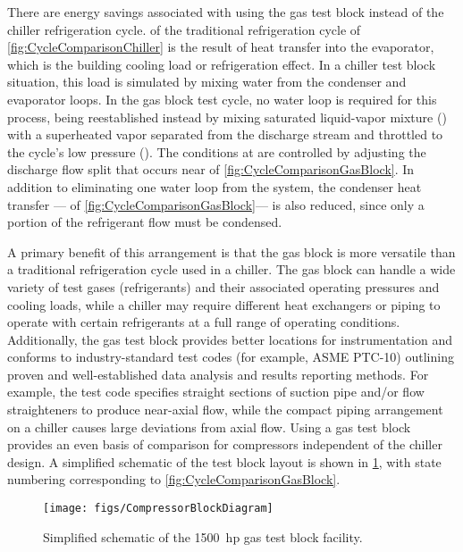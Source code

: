 There are energy savings associated with using the gas test block 
instead of the chiller refrigeration cycle. 
 of the traditional refrigeration cycle of \cref{fig:CycleComparisonChiller} 
is the result of heat transfer into the evaporator, 
which is the building cooling load or refrigeration effect. 
In a chiller test block situation, this load is simulated 
by mixing water from the condenser and evaporator loops. 
In the gas block test cycle, no water loop is required for this process, 
 being reestablished instead by mixing saturated liquid-vapor mixture () 
with a superheated vapor separated from the discharge stream and throttled to the cycle's low pressure (). 
The conditions at  are controlled by adjusting 
the discharge flow split that occurs near  of \cref{fig:CycleComparisonGasBlock}. 
In addition to eliminating one water loop from the system, the condenser heat transfer%
--- of \cref{fig:CycleComparisonGasBlock}---%
is also reduced, since only a portion of the refrigerant flow must be condensed.

A primary benefit of this arrangement is that the gas block is 
more versatile than a traditional refrigeration cycle used in a chiller. 
The gas block can handle a wide variety of test gases (refrigerants) 
and their associated operating pressures and cooling loads, 
while a chiller may require different heat exchangers or piping 
to operate with certain refrigerants at a full range of operating conditions.
Additionally, the gas test block provides better locations for instrumentation 
and conforms to industry-standard test codes (for example, ASME%
PTC-10) 
outlining proven and well-established data analysis and results reporting methods. 
For example, the test code specifies straight sections of suction pipe and/or flow straighteners 
to produce near-axial flow, while the compact piping arrangement on a chiller causes large deviations from axial flow. 
Using a gas test block provides an even basis of comparison for compressors independent of the chiller design. 
A simplified schematic of the test block layout is shown in \cref{fig:SimpSchematic}, 
with state numbering corresponding to \cref{fig:CycleComparisonGasBlock}. 
\begin{figure}[htbp]
	\centering
	\texttt{[image: figs/CompressorBlockDiagram]}
	\caption{Simplified schematic of the \SI{1500}{hp} gas test block facility.}
	\label{fig:SimpSchematic}
\end{figure}

